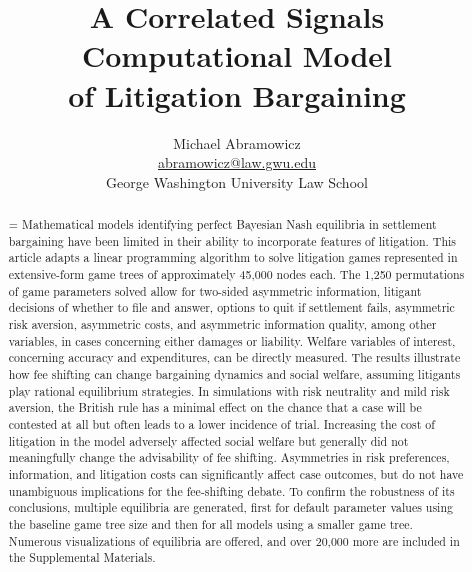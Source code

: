 \documentclass{article}
\newenvironment{nohyphen}
  {\tolerance=1%
   \emergencystretch=\maxdimen%
   \hyphenpenalty=10000%
   \hbadness=10000}%
  {\par}%
\begin{document}
\title{A Correlated Signals \\ Computational Model \\ of Litigation Bargaining}
\author{Michael Abramowicz \\ \href{mailto:abramowicz@law.gwu.edu}{abramowicz@law.gwu.edu} \\ George Washington University Law School}

\maketitle

\begin{abstract}
\begin{nohyphen}
Mathematical models identifying perfect Bayesian Nash equilibria in settlement bargaining have been limited in their ability to incorporate features of litigation. This article adapts a linear programming algorithm to solve litigation games represented in extensive-form game trees of approximately 45,000 nodes each. The 1,250 permutations of game parameters solved allow for two-sided asymmetric information, litigant decisions of whether to file and answer, options to quit if settlement fails, asymmetric risk aversion, asymmetric costs, and asymmetric information quality, among other variables, in cases concerning either damages or liability. Welfare variables of interest, concerning accuracy and expenditures, can be directly measured. The results illustrate how fee shifting can change bargaining dynamics and social welfare, assuming litigants play rational equilibrium strategies. In simulations with risk neutrality and mild risk aversion, the British rule has a minimal effect on the chance that a case will be contested at all but often leads to a lower incidence of trial. Increasing the cost of litigation in the model adversely affected social welfare but generally did not meaningfully change the advisability of fee shifting. Asymmetries in risk preferences, information, and litigation costs can significantly affect case outcomes, but do not have unambiguous implications for the fee-shifting debate. To confirm the robustness of its conclusions, multiple equilibria are generated, first for default parameter values using the baseline game tree size and then for all models using a smaller game tree. Numerous visualizations of equilibria are offered, and over 20,000 more are included in the Supplemental Materials. 
\end{nohyphen}
\end{abstract}
\end{document}

